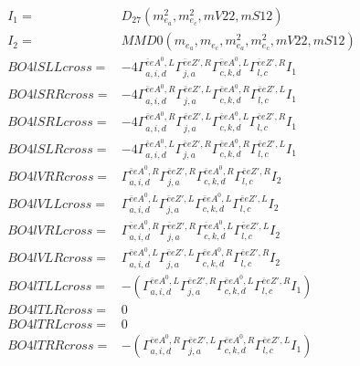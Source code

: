 \documentclass[A4,landscape]{article}
\begin{document}
\begin{align} 
I_1 = & D_{27}(m^2_{e_{{a}}}, m^2_{e_{{c}}}, mV22, mS12) \\ 
I_2 = & MMD0(m_{e_{{a}}}, m_{e_{{c}}}, m^2_{e_{{a}}}, m^2_{e_{{c}}}, mV22, mS12) \\ 
  BO4lSLLcross= & -4  \Gamma^{\bar{e}e A^0 ,L}_{a, i, d} \Gamma^{\bar{e}e {Z'} ,R}_{j, a} \Gamma^{\bar{e}e A^0 ,L}_{c, k, d} \Gamma^{\bar{e}e {Z'} ,R}_{l, c} I_1 \\ 
  BO4lSRRcross= & -4  \Gamma^{\bar{e}e A^0 ,R}_{a, i, d} \Gamma^{\bar{e}e {Z'} ,L}_{j, a} \Gamma^{\bar{e}e A^0 ,R}_{c, k, d} \Gamma^{\bar{e}e {Z'} ,L}_{l, c} I_1 \\ 
  BO4lSRLcross= & -4  \Gamma^{\bar{e}e A^0 ,R}_{a, i, d} \Gamma^{\bar{e}e {Z'} ,L}_{j, a} \Gamma^{\bar{e}e A^0 ,L}_{c, k, d} \Gamma^{\bar{e}e {Z'} ,R}_{l, c} I_1 \\ 
  BO4lSLRcross= & -4  \Gamma^{\bar{e}e A^0 ,L}_{a, i, d} \Gamma^{\bar{e}e {Z'} ,R}_{j, a} \Gamma^{\bar{e}e A^0 ,R}_{c, k, d} \Gamma^{\bar{e}e {Z'} ,L}_{l, c} I_1 \\ 
  BO4lVRRcross= &  \Gamma^{\bar{e}e A^0 ,R}_{a, i, d} \Gamma^{\bar{e}e {Z'} ,R}_{j, a} \Gamma^{\bar{e}e A^0 ,R}_{c, k, d} \Gamma^{\bar{e}e {Z'} ,R}_{l, c} I_2 \\ 
  BO4lVLLcross= &  \Gamma^{\bar{e}e A^0 ,L}_{a, i, d} \Gamma^{\bar{e}e {Z'} ,L}_{j, a} \Gamma^{\bar{e}e A^0 ,L}_{c, k, d} \Gamma^{\bar{e}e {Z'} ,L}_{l, c} I_2 \\ 
  BO4lVRLcross= &  \Gamma^{\bar{e}e A^0 ,R}_{a, i, d} \Gamma^{\bar{e}e {Z'} ,R}_{j, a} \Gamma^{\bar{e}e A^0 ,L}_{c, k, d} \Gamma^{\bar{e}e {Z'} ,L}_{l, c} I_2 \\ 
  BO4lVLRcross= &  \Gamma^{\bar{e}e A^0 ,L}_{a, i, d} \Gamma^{\bar{e}e {Z'} ,L}_{j, a} \Gamma^{\bar{e}e A^0 ,R}_{c, k, d} \Gamma^{\bar{e}e {Z'} ,R}_{l, c} I_2 \\ 
  BO4lTLLcross= & -( \Gamma^{\bar{e}e A^0 ,L}_{a, i, d} \Gamma^{\bar{e}e {Z'} ,R}_{j, a} \Gamma^{\bar{e}e A^0 ,L}_{c, k, d} \Gamma^{\bar{e}e {Z'} ,R}_{l, c} I_1) \\ 
  BO4lTLRcross= & 0 \\ 
  BO4lTRLcross= & 0 \\ 
  BO4lTRRcross= & -( \Gamma^{\bar{e}e A^0 ,R}_{a, i, d} \Gamma^{\bar{e}e {Z'} ,L}_{j, a} \Gamma^{\bar{e}e A^0 ,R}_{c, k, d} \Gamma^{\bar{e}e {Z'} ,L}_{l, c} I_1) \\ 
\end{align} 
\end{document}
